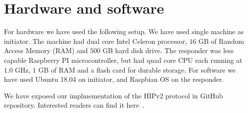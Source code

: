 \section{Hardware and software}
\label{sec:hardware}

For hardware we have used the following setup. We have used single 
machine as initiator. The machine had dual core Intel Celeron 
processor, $16$ GB of Random Access Memory (RAM) and $500$ GB
hard disk drive. The responder was less capable Raspberry PI 
microcontroller, but had quad core CPU each running at $1.0$ GHz, 
$1$ GB of RAM and a flash card for durable storage. For software 
we have used Ubuntu 18.04 on initiator, and Raspbian OS on the responder.

We have exposed our implmementation of the HIPv2 protocol in GitHub repository.
Interested readers can find it here~\cite{impl}.